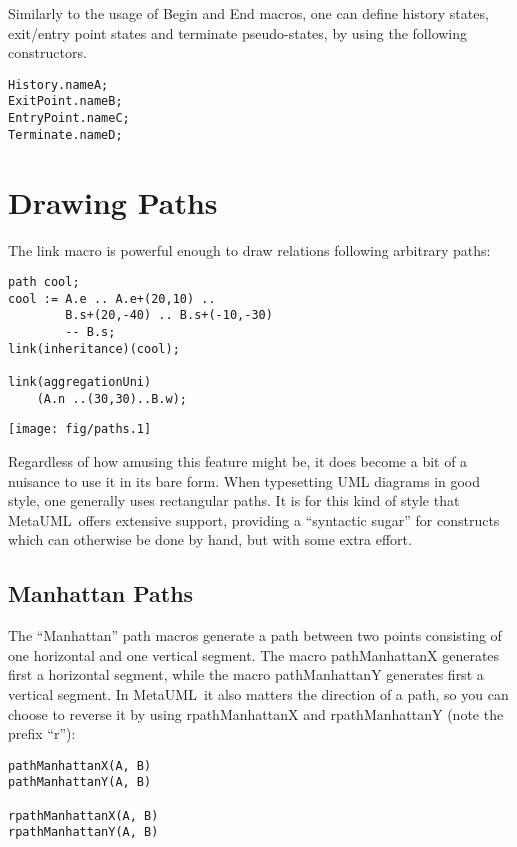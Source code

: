 \documentclass{article}
\newcommand{\code}{\ttfamily}
\newcommand{\metauml}{MetaUML}
\begin{document}
Similarly to the usage of {\code Begin} and {\code End} macros, one can define history states,
exit/entry point states and terminate pseudo-states, by using the following constructors.

\begin{verbatim}
History.nameA;
ExitPoint.nameB;
EntryPoint.nameC;
Terminate.nameD;
\end{verbatim}

\section{Drawing Paths}

The {\code link} macro is powerful enough to draw relations following arbitrary paths:

\begin{multicols}{2}
\begin{verbatim}
path cool;
cool := A.e .. A.e+(20,10) ..
        B.s+(20,-40) .. B.s+(-10,-30)
        -- B.s;
link(inheritance)(cool);

link(aggregationUni)
    (A.n ..(30,30)..B.w);
\end{verbatim}
\columnbreak
\hspace{1cm}\texttt{[image: fig/paths.1]}
\end{multicols}

Regardless of how amusing this feature might be, it does become a bit of a nuisance to
use it in its bare form. When typesetting UML diagrams in good style, one generally
uses rectangular paths. It is for this kind of style that \metauml\ offers extensive
support, providing a ``syntactic sugar'' for constructs which can otherwise be
done by hand, but with some extra effort.

\subsection{Manhattan Paths}

The ``Manhattan'' path macros generate a path between two points consisting of one
horizontal and one vertical segment. The macro {\code pathManhattanX} generates first a
horizontal segment, while the macro {\code pathManhattanY} generates first a
vertical segment. In \metauml\ it also matters the direction of a path, so you
can choose to reverse it by using {\code rpathManhattanX} and {\code rpathManhattanY}
(note the prefix ``{\code r}''):

\begin{verbatim}
pathManhattanX(A, B)
pathManhattanY(A, B)

rpathManhattanX(A, B)
rpathManhattanY(A, B)
\end{verbatim}
\end{document}
